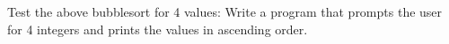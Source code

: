 Test the above bubblesort for 4 values: Write a program that prompts the user for 4 integers and prints the values in ascending order.

